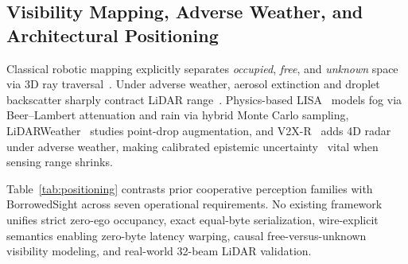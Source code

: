 \documentclass[journal]{IEEEtran}
\begin{document}
\subsection{Visibility Mapping, Adverse Weather, and Architectural Positioning}

Classical robotic mapping explicitly separates \textit{occupied}, \textit{free}, and \textit{unknown} space via 3D ray traversal~\cite{amanatides1987ray,elfes1989occupancy,hornung2013octomap}. Under adverse weather, aerosol extinction and droplet backscatter sharply contract LiDAR range~\cite{bijelic2020fog}. Physics-based LISA~\cite{kilic2021lisa} models fog via Beer--Lambert attenuation and rain via hybrid Monte Carlo sampling, LiDARWeather~\cite{park2024lidarweather} studies point-drop augmentation, and V2X-R~\cite{huang2025v2xr} adds 4D radar under adverse weather, making calibrated epistemic uncertainty~\cite{shannon1948entropy,guo2017calibration} vital when sensing range shrinks.

Table~\ref{tab:positioning} contrasts prior cooperative perception families with BorrowedSight across seven operational requirements. No existing framework unifies strict zero-ego occupancy, exact equal-byte serialization, wire-explicit semantics enabling zero-byte latency warping, causal free-versus-unknown visibility modeling, and real-world 32-beam LiDAR validation.
\end{document}
